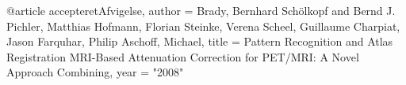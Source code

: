 @article{ accepteretAfvigelse,
       author = {Brady, Bernhard Schölkopf and Bernd J. Pichler, Matthias Hofmann, Florian Steinke, Verena Scheel, Guillaume Charpiat, Jason Farquhar, Philip Aschoff, Michael},
       title = {Pattern Recognition and Atlas Registration MRI-Based Attenuation Correction for PET/MRI: A Novel Approach Combining},
       year = "2008" }


